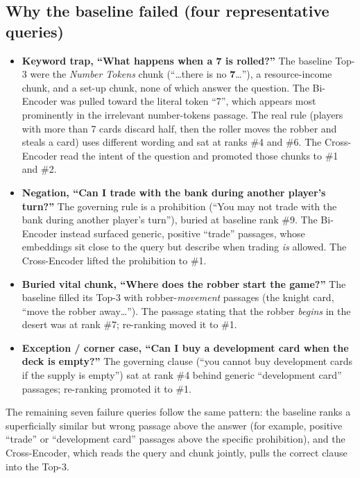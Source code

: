 \documentclass[11pt]{article}
\begin{document}
\subsection{Why the baseline failed (four representative queries)}
\begin{itemize}[leftmargin=1.3em]
\item \textbf{Keyword trap, ``What happens when a 7 is rolled?''} The baseline Top-3 were the
  \emph{Number Tokens} chunk (``\dots there is no \textbf{7}\dots''), a resource-income chunk, and a
  set-up chunk, none of which answer the question. The Bi-Encoder was pulled toward the literal token
  ``7'', which appears most prominently in the irrelevant number-tokens passage. The real rule
  (players with more than 7 cards discard half, then the roller moves the robber and steals a card)
  uses different wording and sat at ranks \#4 and \#6. The Cross-Encoder read the intent of the
  question and promoted those chunks to \#1 and \#2.
\item \textbf{Negation, ``Can I trade with the bank during another player's turn?''} The governing
  rule is a prohibition (``You may not trade with the bank during another player's turn''), buried at
  baseline rank \#9. The Bi-Encoder instead surfaced generic, positive ``trade'' passages, whose
  embeddings sit close to the query but describe when trading \emph{is} allowed. The Cross-Encoder
  lifted the prohibition to \#1.
\item \textbf{Buried vital chunk, ``Where does the robber start the game?''} The baseline filled its
  Top-3 with robber-\emph{movement} passages (the knight card, ``move the robber away\dots''). The
  passage stating that the robber \emph{begins} in the desert was at rank \#7; re-ranking moved it to
  \#1.
\item \textbf{Exception / corner case, ``Can I buy a development card when the deck is empty?''} The
  governing clause (``you cannot buy development cards if the supply is empty'') sat at rank \#4
  behind generic ``development card'' passages; re-ranking promoted it to \#1.
\end{itemize}

\noindent The remaining seven failure queries follow the same pattern: the baseline ranks a
superficially similar but wrong passage above the answer (for example, positive ``trade'' or
``development card'' passages above the specific prohibition), and the Cross-Encoder, which reads
the query and chunk jointly, pulls the correct clause into the Top-3.
\end{document}
